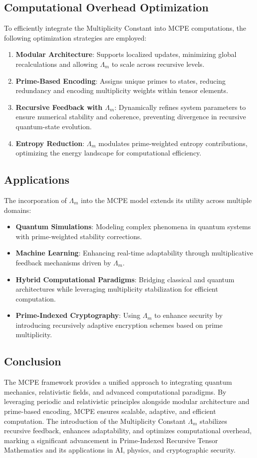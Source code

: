 \documentclass{article}
\theoremstyle{plain}
\begin{document}
\subsection{Computational Overhead Optimization}
To efficiently integrate the Multiplicity Constant into MCPE computations, the following optimization strategies are employed:
\begin{enumerate}
    \item \textbf{Modular Architecture}: Supports localized updates, minimizing global recalculations and allowing \( \Lambda_m \) to scale across recursive levels.
    \item \textbf{Prime-Based Encoding}: Assigns unique primes to states, reducing redundancy and encoding multiplicity weights within tensor elements.
    \item \textbf{Recursive Feedback with \( \Lambda_m \)}: Dynamically refines system parameters to ensure numerical stability and coherence, preventing divergence in recursive quantum-state evolution.
    \item \textbf{Entropy Reduction}: \( \Lambda_m \) modulates prime-weighted entropy contributions, optimizing the energy landscape for computational efficiency.
\end{enumerate}

\subsection{Applications}
The incorporation of \( \Lambda_m \) into the MCPE model extends its utility across multiple domains:
\begin{itemize}
    \item \textbf{Quantum Simulations}: Modeling complex phenomena in quantum systems with prime-weighted stability corrections.
    \item \textbf{Machine Learning}: Enhancing real-time adaptability through multiplicative feedback mechanisms driven by \( \Lambda_m \).
    \item \textbf{Hybrid Computational Paradigms}: Bridging classical and quantum architectures while leveraging multiplicity stabilization for efficient computation.
    \item \textbf{Prime-Indexed Cryptography}: Using \( \Lambda_m \) to enhance security by introducing recursively adaptive encryption schemes based on prime multiplicity.
\end{itemize}

\subsection{Conclusion}
The MCPE framework provides a unified approach to integrating quantum mechanics, relativistic fields, and advanced computational paradigms. By leveraging periodic and relativistic principles alongside modular architecture and prime-based encoding, MCPE ensures scalable, adaptive, and efficient computation. The introduction of the Multiplicity Constant \( \Lambda_m \) stabilizes recursive feedback, enhances adaptability, and optimizes computational overhead, marking a significant advancement in Prime-Indexed Recursive Tensor Mathematics and its applications in AI, physics, and cryptographic security.
\end{document}
